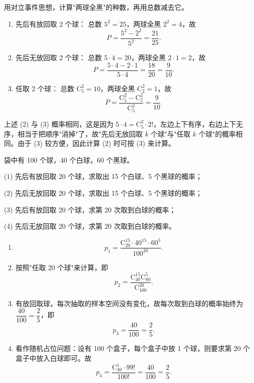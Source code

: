 ﻿\documentclass[lang=cn,11pt]{elegantbook}
\begin{document}
\begin{solution}
用对立事件思想，计算"两球全黑"的种数，再用总数减去它。
\begin{enumerate}
    \item 先后有放回取 2 个球：
    总数 \(5^2 = 25\)，两球全黑 \(2^2 = 4\)，故
    \[
    P = \frac{5^2 - 2^2}{5^2} = \frac{21}{25}.
    \]
    \item 先后无放回取 2 个球：
    总数 \(5 \cdot 4 = 20\)，两球全黑 \(2 \cdot 1 = 2\)，故
    \[
    P = \frac{5 \cdot 4 - 2 \cdot 1}{5 \cdot 4} = \frac{18}{20} = \frac{9}{10}.
    \]
    \item 任取 2 个球：
    总数 \(\mathrm{C}_5^2 = 10\)，两球全黑 \(\mathrm{C}_2^2 = 1\)，故
    \[
    P = \frac{\mathrm{C}_5^2 - \mathrm{C}_2^2}{\mathrm{C}_5^2} = \frac{9}{10}.
    \]
\end{enumerate}
\end{solution}

\begin{note}
上述 (2) 与 (3) 概率相同，这是因为 \(5 \cdot 4 = \mathrm{C}_5^2 \cdot 2!\)，左边上下有序，右边上下无序，相当于把顺序"消掉"了，故"先后无放回取 \(k\) 个球"与"任取 \(k\) 个球"的概率相同。由于 (3) 较方便，因此计算 (2) 时可按 (3) 来计算。
\end{note}

\begin{exercise}\label{exer:1-6}
袋中有 100 个球，40 个白球，60 个黑球。\par
(1) 先后有放回取 20 个球，求取出 15 个白球、5 个黑球的概率；\par
(2) 先后无放回取 20 个球，求取出 15 个白球、5 个黑球的概率；\par
(3) 先后有放回取 20 个球，求第 20 次取到白球的概率；\par
(4) 先后无放回取 20 个球，求第 20 次取到白球的概率。
\end{exercise}
\begin{solution}
\begin{enumerate}
    \item \[
    p_1 = \frac{\mathrm{C}_{20}^{15} \cdot 40^{15} \cdot 60^{5}}{100^{20}}.
    \]
    \item 按照"任取 20 个球"来计算，即
    \[
    p_2 = \frac{\mathrm{C}_{40}^{15} \mathrm{C}_{60}^{5}}{\mathrm{C}_{100}^{20}}.
    \]
    \item 有放回取球，每次抽取的样本空间没有变化，故每次取到白球的概率始终为 \(\dfrac{40}{100} = \dfrac{2}{5}\)，即
    \[
    p_3 = \frac{40}{100} = \frac{2}{5}.
    \]
    \item 看作随机占位问题：设有 100 个盒子，每个盒子中放 1 个球，则要求第 20 个盒子中放入白球即可。故
    \[
    p_4 = \frac{\mathrm{C}_{40}^1 \cdot 99!}{100!} = \frac{40}{100} = \frac{2}{5}.
    \]
\end{enumerate}
\end{solution}
\end{document}
